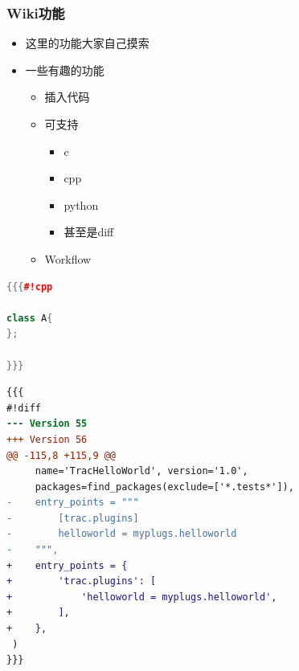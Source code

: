 \begin{frame}
    \frametitle{Wiki功能}
    \begin{itemize}    
        \item 这里的功能大家自己摸索
        \item 一些有趣的功能
            \begin{itemize}
                \item 插入代码
                \item 可支持
                    \begin{itemize}
                        \item c
                        \item cpp
                        \item python
                        \item 甚至是diff
                    \end{itemize}
                \item Workflow
            \end{itemize}
    \end{itemize}
\end{frame}

\newsavebox{\TracWikiCodeCpp}
\begin{lrbox}{\TracWikiCodeCpp}
\begin{lstlisting}[language=c++]
{{{#!cpp

class A{
};

}}}
\end{lstlisting}
\end{lrbox}


\newsavebox{\TracWikiCodeDiff}
\begin{lrbox}{\TracWikiCodeDiff}
\begin{lstlisting}[language=diff]
{{{
#!diff
--- Version 55
+++ Version 56
@@ -115,8 +115,9 @@
     name='TracHelloWorld', version='1.0',
     packages=find_packages(exclude=['*.tests*']),
-    entry_points = """
-        [trac.plugins]
-        helloworld = myplugs.helloworld
-    """,
+    entry_points = {
+        'trac.plugins': [
+            'helloworld = myplugs.helloworld',
+        ],
+    },
 )
}}}
\end{lstlisting}
\end{lrbox}

